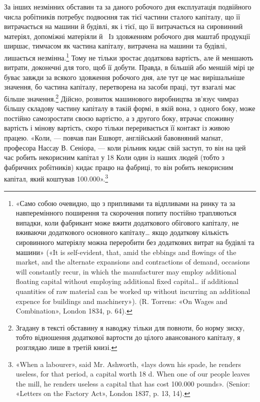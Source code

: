 За інших незмінних обставин та за даного робочого дня експлуатація
подвійного числа робітників потребує подвоєння так
тієї частини сталого капіталу, що її витрачається на машини й
будівлі, як і тієї, що її витрачається на сировинний матеріял,
допоміжні матеріяли й~ Із здовженням робочого дня маштаб
продукції ширшає, тимчасом як частина капіталу, витрачена
на машини та будівлі, лишається незмінна.\footnote{
«Само собою очевидно, що з припливами та відпливами на ринку
та за навперемінного поширення та скорочення попиту постійно трапляються випадки, коли фабрикант може вжити додаткового обігового капіталу,
не вживаючи додаткового основного капіталу\dots{} якщо додаткову
кількість сировинного матеріялу можна переробити без додаткових витрат
на будівлі та машини» («It is self-evident, that, amid the ebbings and
flowings of the market, and the alternate expansions and contractions of
demand, occasions will constantly recur, in which the manufacturer may
employ additional floating capital without employing additional fixed
capital\dots{} if additional quantities of raw material can be worked up without
incurring an additional expence for buildings and machinery»).
(R. Torrens: «On Wages and Combination», London 1834, p. 64).
} Тому не тільки
зростає додаткова вартість, але й меншають витрати, доконечні
для того, щоб її добути. Правда, в більшій або меншій мірі це
буває завжди за всякого здовження робочого дня, але тут це
має вирішальніше значення, бо частина капіталу, перетворена
на засоби праці, тут взагалі має більше значення.\footnote{
Згадану в тексті обставину я наводжу тільки для повноти, бо
норму зиску, тобто відношення додаткової вартости до цілого авансованого
капіталу, я розглядаю лише в третій книзі.
} Дійсно,
розвиток машинового виробництва зв’язує чимраз більшу складову
частину капіталу в такій формі, в якій вона, з одного боку, може
постійно самозростати своєю вартістю, а з другого боку, втрачає
споживну вартість і мінову вартість, скоро тільки переривається
її контакт із живою працею. «Коли, — повчав пан Ешворт,
англійський бавовняний маґнат, професора Нассау В. Сеніора, —
коли рільник кидає свій заступ, то він на цей час робить некорисним
капітал у 18 Коли один із наших людей (тобто
з фабричних робітників) кидає працю на фабриці, то він робить
некорисним капітал, який коштував \num{100.000}».\footnote{
«When a labourer», said Mr. Ashworth, «lays down his spade, he
renders useless, for that period, a capital worth 18 d. When one of our people
leaves the mill, he renders useless a capital that has cost \num{100.000} pounds».
(Senior: «Letters on the Factory Act», London 1837, p. 13, 14).
}
